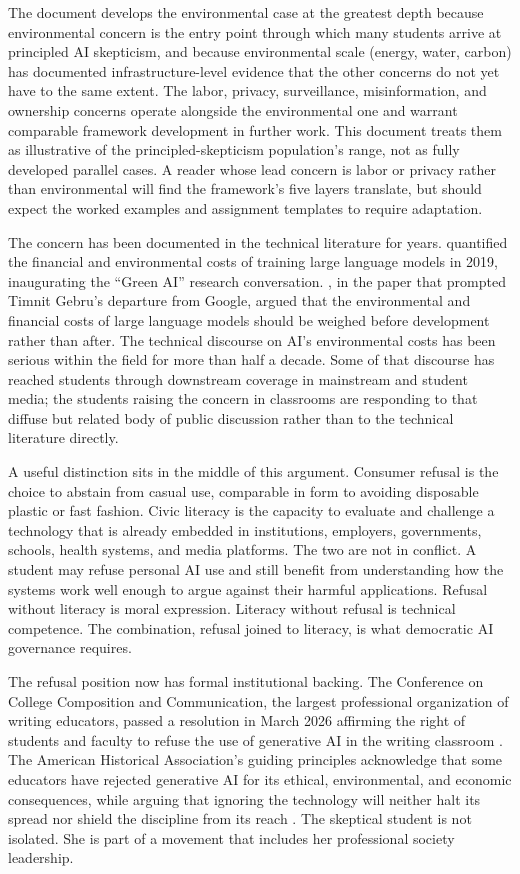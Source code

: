 \documentclass[12pt]{article}
\begin{document}
The document develops the environmental case at the greatest depth because environmental concern is the entry point through which many students arrive at principled AI skepticism, and because environmental scale (energy, water, carbon) has documented infrastructure-level evidence that the other concerns do not yet have to the same extent. The labor, privacy, surveillance, misinformation, and ownership concerns operate alongside the environmental one and warrant comparable framework development in further work. This document treats them as illustrative of the principled-skepticism population's range, not as fully developed parallel cases. A reader whose lead concern is labor or privacy rather than environmental will find the framework's five layers translate, but should expect the worked examples and assignment templates to require adaptation.

The concern has been documented in the technical literature for years. \textcite{strubell2019energy} quantified the financial and environmental costs of training large language models in 2019, inaugurating the ``Green AI'' research conversation. \textcite{bender2021dangers}, in the paper that prompted Timnit Gebru's departure from Google, argued that the environmental and financial costs of large language models should be weighed before development rather than after. The technical discourse on AI's environmental costs has been serious within the field for more than half a decade. Some of that discourse has reached students through downstream coverage in mainstream and student media; the students raising the concern in classrooms are responding to that diffuse but related body of public discussion rather than to the technical literature directly.

A useful distinction sits in the middle of this argument. Consumer refusal is the choice to abstain from casual use, comparable in form to avoiding disposable plastic or fast fashion. Civic literacy is the capacity to evaluate and challenge a technology that is already embedded in institutions, employers, governments, schools, health systems, and media platforms. The two are not in conflict. A student may refuse personal AI use and still benefit from understanding how the systems work well enough to argue against their harmful applications. Refusal without literacy is moral expression. Literacy without refusal is technical competence. The combination, refusal joined to literacy, is what democratic AI governance requires.

The refusal position now has formal institutional backing. The Conference on College Composition and Communication, the largest professional organization of writing educators, passed a resolution in March 2026 affirming the right of students and faculty to refuse the use of generative AI in the writing classroom \autocite{cccc2026resolutions}. The American Historical Association's guiding principles acknowledge that some educators have rejected generative AI for its ethical, environmental, and economic consequences, while arguing that ignoring the technology will neither halt its spread nor shield the discipline from its reach \autocite{aha2025guiding}. The skeptical student is not isolated. She is part of a movement that includes her professional society leadership.
\end{document}
